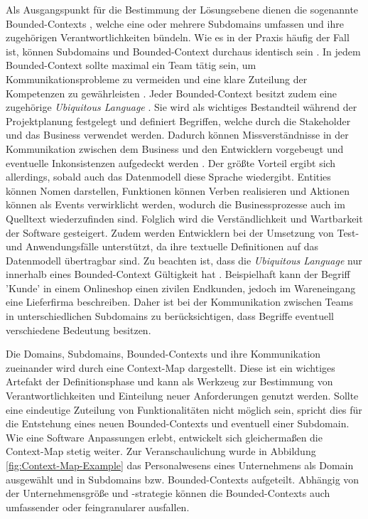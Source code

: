 Als Ausgangspunkt für die Bestimmung der Lösungsebene dienen die sogenannte Bounded-Contexts \cite[S. 57]{Vernon.2015}, welche eine oder mehrere Subdomains umfassen und ihre zugehörigen Verantwortlichkeiten bündeln. Wie es in der Praxis häufig der Fall ist, können Subdomains und Bounded-Context durchaus identisch sein \cite[S. 57]{Vernon.2015}. In jedem Bounded-Context sollte maximal ein Team tätig sein, um Kommunikationsprobleme zu vermeiden und eine klare Zuteilung der Kompetenzen zu gewährleisten \cite{Brandolini.2021}. Jeder Bounded-Context besitzt zudem eine zugehörige \emph{Ubiquitous Language} \cite[S. 62]{Vernon.2015}. Sie wird als wichtiges Bestandteil während der Projektplanung festgelegt und definiert Begriffen, welche durch die Stakeholder und das Business verwendet werden. Dadurch können Missverständnisse in der Kommunikation zwischen dem Business und den Entwicklern vorgebeugt und eventuelle Inkonsistenzen aufgedeckt werden \cite[S. 336f.]{Evans.2011}. Der größte Vorteil ergibt sich allerdings, sobald auch das Datenmodell diese Sprache wiedergibt. Entities können Nomen darstellen, Funktionen können Verben realisieren und Aktionen können als Events verwirklicht werden, wodurch die Businessprozesse auch im Quelltext wiederzufinden sind. Folglich wird die Verständlichkeit und Wartbarkeit der Software \cite[S. 24ff.]{Evans.2011} gesteigert. Zudem werden Entwicklern bei der Umsetzung von Test- und Anwendungsfälle unterstützt, da ihre textuelle Definitionen auf das Datenmodell übertragbar sind. Zu beachten ist, dass die \emph{Ubiquitous Language} nur innerhalb eines Bounded-Context Gültigkeit hat \cite[S. 62]{Vernon.2015}. Beispielhaft kann der Begriff 'Kunde' in einem Onlineshop einen zivilen Endkunden, jedoch im Wareneingang eine Lieferfirma beschreiben. Daher ist bei der Kommunikation zwischen Teams in unterschiedlichen Subdomains zu berücksichtigen, dass Begriffe eventuell verschiedene Bedeutung besitzen.

Die Domains, Subdomains, Bounded-Contexts und ihre Kommunikation zueinander wird durch eine Context-Map dargestellt. Diese ist ein wichtiges Artefakt der Definitionsphase und kann als Werkzeug zur Bestimmung von Verantwortlichkeiten und Einteilung neuer Anforderungen genutzt werden. Sollte eine eindeutige Zuteilung von Funktionalitäten nicht möglich sein, spricht dies für die Entstehung eines neuen Bounded-Contexts und eventuell einer Subdomain. Wie eine Software Anpassungen erlebt, entwickelt sich gleichermaßen die Context-Map stetig weiter. \cite[S. 87ff]{Vernon.2015} Zur Veranschaulichung wurde in Abbildung \ref{fig:Context-Map-Example} das Personalwesens eines Unternehmens als Domain ausgewählt und in Subdomains bzw. Bounded-Contexts aufgeteilt. Abhängig von der Unternehmensgröße und -strategie können die Bounded-Contexts auch umfassender oder feingranularer ausfallen.

